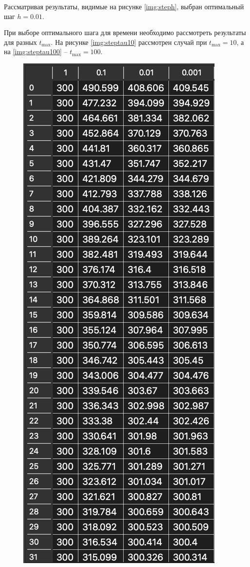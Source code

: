 \begin{enumerate}
        Рассматривая результаты, видимые на рисунке \ref{img:steph}, выбран оптимальный шаг $h = 0.01$.

        При выборе оптимального шага для времени необходимо рассмотреть результаты для разных $t_\text{max}$. На рисунке \ref{img:steptau10} рассмотрен случай при $t_\text{max} = 10$, а на \ref{img:steptau100} -- $t_\text{max} = 100$.

        \begin{minipage}{0.5\textwidth}
            \begin{flushleft}
                \begin{figure}[H]
                    \centering
                    \includegraphics[scale=0.60]{img/steptau10.png}

\end{figure}
\end{flushleft}
\end{minipage}
\end{enumerate}
